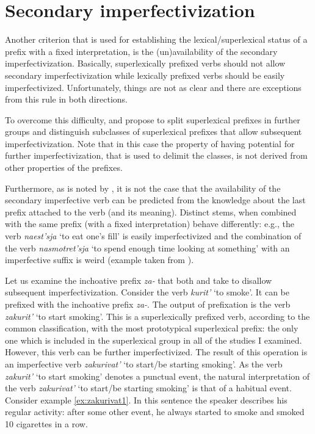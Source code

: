 \section{Secondary imperfectivization}\label{section:new:imperfectivization}
Another criterion that is used for establishing the lexical/superlexical status of a prefix with a fixed interpretation, is the (un)availability of the secondary imperfectivization. Basically, superlexically prefixed verbs should not allow secondary imperfectivization while lexically prefixed verbs should be easily imperfectivized. Unfortunately, things are not as clear and there are exceptions from this rule in both directions. 

To overcome this difficulty, \citet{Svenonius:04b} and \citet{Tatevosov:07, Tatevosov:09} propose to split superlexical prefixes in further groups and distinguish subclasses of superlexical prefixes that allow subsequent imperfectivization. Note that in this case the property of having potential for further imperfectivization, that is used to delimit the classes, is not derived from other properties of the prefixes.

Furthermore, as is noted by \citet[35]{Kagan:book}, it is not the case that the availability of the secondary imperfective verb can be predicted from the knowledge about the last prefix attached to the verb (and its meaning). Distinct stems, when combined with the same prefix (with a fixed interpretation) behave differently: e.g., the verb \textit{naest’sja} `to eat one's fill' is easily imperfectivized and the combination of the verb \textit{nasmotret'sja} `to spend enough time looking at something' with an imperfective suffix is weird (example taken from \citealt[35]{Kagan:book}).

Let us examine the inchoative prefix \textit{za-} that both \citet[230]{Svenonius:04b} and \citet[116]{Tatevosov:09} take to disallow subsequent imperfectivization. Consider the verb \textit{kurit'}\textsuperscript{\IPF} `to smoke'. It can be prefixed with the inchoative prefix {\textit{za-}.} The output of prefixation is the verb \textit{zakurit'}\textsuperscript{\PF} `to start smoking'. This is a superlexically prefixed verb, according to the common classification, with the most prototypical superlexical prefix: the only one which is included in the superlexical group in all of the studies I examined. However, this verb can be further imperfectivized. The result of this operation is an imperfective verb \textit{zakurivat'}\textsuperscript{\IPF} `to start/be starting smoking'. As the verb \textit{zakurit'} `to start smoking' denotes a punctual event, the natural interpretation of the verb \textit{zakurivat'} `to start/be starting smoking'  is that of a habitual event. Consider example \ref{ex:zakurivat1}. In this sentence the speaker describes his regular activity: after some other event, he always started to smoke and smoked 10 cigarettes in a row. 

